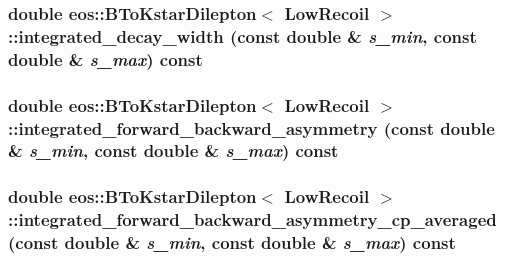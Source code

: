 \label{classeos_1_1BToKstarDilepton_3_01LowRecoil_01_4_a0dc18658255a6b4bd15c91bd99020a57}
\hypertarget{classeos_1_1BToKstarDilepton_3_01LowRecoil_01_4_a503301f9de68d3c559706021fce6f213}{
\subsubsection[{integrated\_\-decay\_\-width}]{\setlength{\rightskip}{0pt plus 5cm}double eos::BToKstarDilepton$<$ {\bf LowRecoil} $>$::integrated\_\-decay\_\-width (const double \& {\em s\_\-min}, \/  const double \& {\em s\_\-max}) const}}
\label{classeos_1_1BToKstarDilepton_3_01LowRecoil_01_4_a503301f9de68d3c559706021fce6f213}
\hypertarget{classeos_1_1BToKstarDilepton_3_01LowRecoil_01_4_ae8f3b8edaa430209c09bd473bdf0d43a}{
\subsubsection[{integrated\_\-forward\_\-backward\_\-asymmetry}]{\setlength{\rightskip}{0pt plus 5cm}double eos::BToKstarDilepton$<$ {\bf LowRecoil} $>$::integrated\_\-forward\_\-backward\_\-asymmetry (const double \& {\em s\_\-min}, \/  const double \& {\em s\_\-max}) const}}
\label{classeos_1_1BToKstarDilepton_3_01LowRecoil_01_4_ae8f3b8edaa430209c09bd473bdf0d43a}
\hypertarget{classeos_1_1BToKstarDilepton_3_01LowRecoil_01_4_a9d215ad72958a94dd32cd6bd2538486a}{
\subsubsection[{integrated\_\-forward\_\-backward\_\-asymmetry\_\-cp\_\-averaged}]{\setlength{\rightskip}{0pt plus 5cm}double eos::BToKstarDilepton$<$ {\bf LowRecoil} $>$::integrated\_\-forward\_\-backward\_\-asymmetry\_\-cp\_\-averaged (const double \& {\em s\_\-min}, \/  const double \& {\em s\_\-max}) const}}
